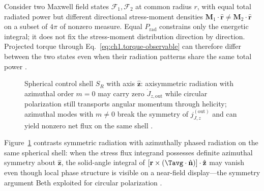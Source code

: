 Consider two Maxwell field states \(\mathcal{F}_1,\mathcal{F}_2\) at common radius
\(r\), with equal total radiated power but different directional stress-moment
densities \(\mathbf{M}_1\cdot\hat{\mathbf{r}}\neq
\mathbf{M}_2\cdot\hat{\mathbf{r}}\) on a subset of $4\pi$ of nonzero measure. Equal $P_{\mathrm{rad}}$ constrains only the energetic integral; it does not fix the stress-moment distribution direction by direction. Projected torque through Eq.~\eqref{eq:ch1.torque-observable} can therefore differ between the two states even when their radiation patterns share the same total power \cite{stratton1941}.

\label{prop:ch1.torque-observable-criterion}
\begin{figure}[t]
\centering
\VolIPhysFig{\VolIPhysTorqueBalanceSurface}
\caption{Spherical control shell $S_R$ with axis $\hat{\mathbf{z}}$: axisymmetric radiation with azimuthal order $m=0$ may carry zero $\dot J_{z,\mathrm{out}}$ while circular polarization still transports angular momentum through helicity; azimuthal modes with $m\neq 0$ break the symmetry of $j_{J,z}^{\mathrm{(out)}}$ and can yield nonzero net flux on the same shell \cite{beth1936,stratton1941}.}
\label{fig:ch1.wp-torque-balance-surface}
\end{figure}

Figure~\ref{fig:ch1.wp-torque-balance-surface} contrasts symmetric radiation with azimuthally phased
radiation on the same spherical shell: when the stress flux integrand possesses definite azimuthal
symmetry about $\hat{\mathbf{z}}$, the solid-angle integral of
$[\mathbf{r}\times(\Tavg\cdot\hat{\mathbf{n}})]\cdot\hat{\mathbf{z}}$ may vanish even though
local phase structure is visible on a near-field display---the symmetry argument Beth exploited for
circular polarization \cite{beth1936,stratton1941}.

